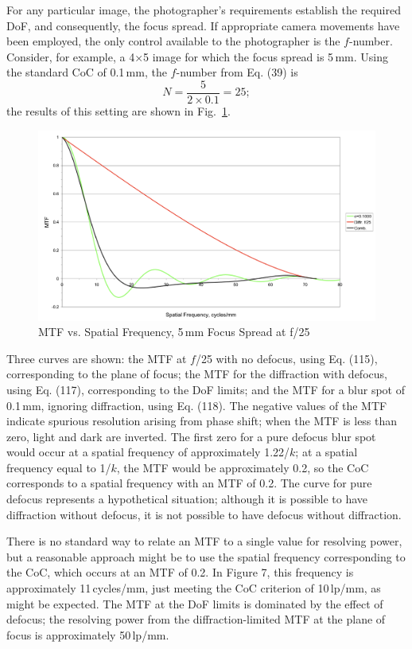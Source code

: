 \documentclass[11pt, oneside]{scrartcl}   	%
\begin{document}
For any particular image, the photographer’s requirements establish the required DoF, and consequently, the focus spread. If appropriate camera movements have been employed, the only control available to the photographer is the $f$-number. Consider, for example, a 4×5 image for which the focus spread is 5\,mm. Using the standard CoC of 0.1\,mm, the $f$-number from Eq. (39) is
\begin{equation}
N = \frac5{2×0.1} = 25; 
\end{equation}
the results of this setting are shown in Fig.~\ref{fig:MTFvssf25}.
\begin{figure}[htbp] %
   \centering
   \includegraphics[width=\linewidth]{figure/fig_dofd_7} 
   \caption{MTF vs. Spatial Frequency, 5\,mm Focus Spread at f/25}
   \label{fig:MTFvssf25}
\end{figure}
Three curves are shown: the MTF at $f$/25 with no defocus, using Eq. (115), corresponding to the plane of focus; the MTF for the diffraction with defocus, using Eq. (117), corresponding to the DoF limits; and the MTF for a blur spot of 0.1\,mm, ignoring diffraction, using Eq. (118). The negative values of the MTF indicate spurious resolution arising from phase shift; when the MTF is less than zero, light and dark are inverted. The first zero for a pure defocus blur spot would occur at a spatial frequency of approximately 1.22/$k$; at a spatial frequency equal to 1/$k$, the MTF would be approximately 0.2, so the CoC corresponds to a spatial frequency with an MTF of 0.2. The curve for pure defocus represents a hypothetical situation; although it is possible to have diffraction without defocus, it is not possible to have defocus without diffraction.

There is no standard way to relate an MTF to a single value for resolving power, but a reasonable approach might be to use the spatial frequency corresponding to the CoC, which occurs at an MTF of 0.2. In Figure 7, this frequency is approximately 11\,cycles/mm, just meeting the CoC criterion of 10\,lp/mm, as might be expected. The MTF at the DoF limits is dominated by the effect of defocus; the resolving power from the diffraction-limited MTF at the plane of focus is approximately 50\,lp/mm.
\end{document}
